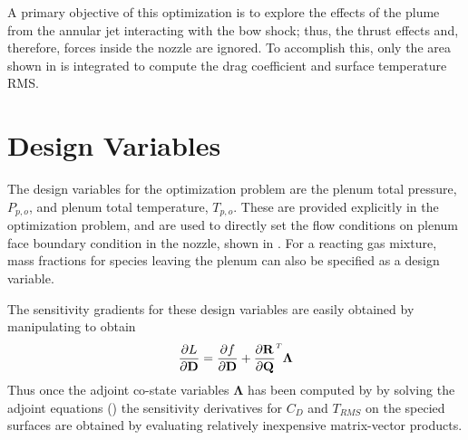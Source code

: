 A primary objective of this optimization is to explore the effects of the plume
from the annular jet interacting with the bow shock; thus, the thrust effects
and, therefore, forces inside the nozzle are ignored.  To accomplish this, only
the area shown in  is integrated to compute the drag
coefficient and surface temperature RMS.


\section{Design Variables}

The design variables for the optimization problem are the plenum total pressure,
$P_{p,o}$, and plenum total temperature, $T_{p,o}$.  These are provided
explicitly in the optimization problem, and are used to directly set the flow
conditions on plenum face boundary condition in the nozzle, shown in
.  For a reacting gas mixture, mass fractions for species
leaving the plenum can also be specified as a design variable.

The sensitivity gradients for these design variables are easily obtained by
manipulating  to obtain
\begin{equation}
  \pd{L}{\md} = \pd{f}{\md} + \rtdiff{}{\mq} \mathbf{\Lambda}
  \label{obj-linearization}
\end{equation}
Thus once the adjoint co-state variables $\mathbf{\Lambda}$ has been computed by
by solving the adjoint equations () the sensitivity
derivatives for $C_D$ and $T_{RMS}$ on the specied surfaces are obtained by
evaluating relatively inexpensive matrix-vector products.
